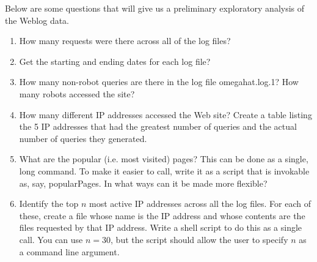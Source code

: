 Below are some questions that will give us a preliminary exploratory
analysis of the Weblog data.
\begin{enumerate}
\item How many requests were there across all of the log files?

\item Get the starting and ending dates for each log file?


\item  How many non-robot queries are there in the log file omegahat.log.1?
How many robots accessed the site?  %

% 
%
%

\item How many different  IP addresses accessed the Web site?
Create a table listing the 5 IP addresses that had
the greatest number of queries and the actual number of queries
they generated.


\item What are the popular (i.e. most visited) pages? 
This can be done as a single,  long  command.
To make it easier to call, write it as a script
that is invokable as, say, popularPages.
In what ways can it be made  more flexible?


\item Identify the top $n$  most active IP addresses across all the
  log files.   For each of these, create a file whose name is the IP address
  and whose contents are the files requested by that IP address.
  Write a shell script to do this as a single call. 
  You can use $n  = 30$, but the script should allow the user to
  specify $n$ as a command line argument. 



\end{enumerate}


